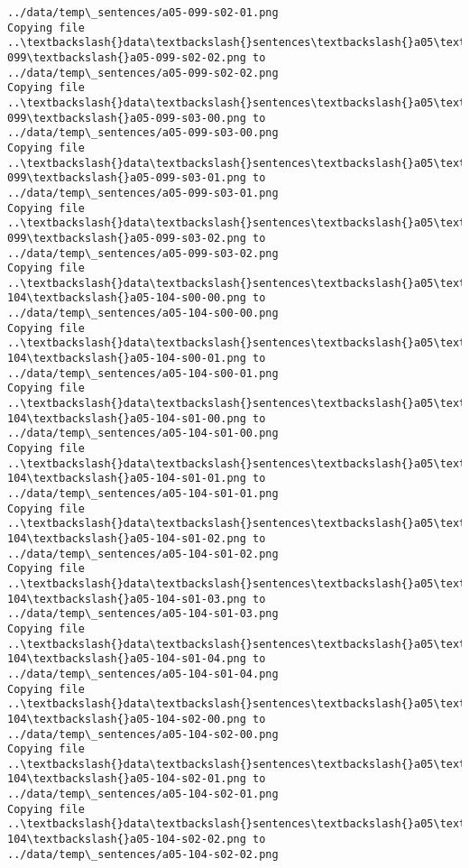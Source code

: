 \documentclass[11pt]{article}
\begin{document}
\begin{Verbatim}[commandchars=\\\{\}]
../data/temp\_sentences/a05-099-s02-01.png
Copying file ..\textbackslash{}data\textbackslash{}sentences\textbackslash{}a05\textbackslash{}a05-099\textbackslash{}a05-099-s02-02.png to
../data/temp\_sentences/a05-099-s02-02.png
Copying file ..\textbackslash{}data\textbackslash{}sentences\textbackslash{}a05\textbackslash{}a05-099\textbackslash{}a05-099-s03-00.png to
../data/temp\_sentences/a05-099-s03-00.png
Copying file ..\textbackslash{}data\textbackslash{}sentences\textbackslash{}a05\textbackslash{}a05-099\textbackslash{}a05-099-s03-01.png to
../data/temp\_sentences/a05-099-s03-01.png
Copying file ..\textbackslash{}data\textbackslash{}sentences\textbackslash{}a05\textbackslash{}a05-099\textbackslash{}a05-099-s03-02.png to
../data/temp\_sentences/a05-099-s03-02.png
Copying file ..\textbackslash{}data\textbackslash{}sentences\textbackslash{}a05\textbackslash{}a05-104\textbackslash{}a05-104-s00-00.png to
../data/temp\_sentences/a05-104-s00-00.png
Copying file ..\textbackslash{}data\textbackslash{}sentences\textbackslash{}a05\textbackslash{}a05-104\textbackslash{}a05-104-s00-01.png to
../data/temp\_sentences/a05-104-s00-01.png
Copying file ..\textbackslash{}data\textbackslash{}sentences\textbackslash{}a05\textbackslash{}a05-104\textbackslash{}a05-104-s01-00.png to
../data/temp\_sentences/a05-104-s01-00.png
Copying file ..\textbackslash{}data\textbackslash{}sentences\textbackslash{}a05\textbackslash{}a05-104\textbackslash{}a05-104-s01-01.png to
../data/temp\_sentences/a05-104-s01-01.png
Copying file ..\textbackslash{}data\textbackslash{}sentences\textbackslash{}a05\textbackslash{}a05-104\textbackslash{}a05-104-s01-02.png to
../data/temp\_sentences/a05-104-s01-02.png
Copying file ..\textbackslash{}data\textbackslash{}sentences\textbackslash{}a05\textbackslash{}a05-104\textbackslash{}a05-104-s01-03.png to
../data/temp\_sentences/a05-104-s01-03.png
Copying file ..\textbackslash{}data\textbackslash{}sentences\textbackslash{}a05\textbackslash{}a05-104\textbackslash{}a05-104-s01-04.png to
../data/temp\_sentences/a05-104-s01-04.png
Copying file ..\textbackslash{}data\textbackslash{}sentences\textbackslash{}a05\textbackslash{}a05-104\textbackslash{}a05-104-s02-00.png to
../data/temp\_sentences/a05-104-s02-00.png
Copying file ..\textbackslash{}data\textbackslash{}sentences\textbackslash{}a05\textbackslash{}a05-104\textbackslash{}a05-104-s02-01.png to
../data/temp\_sentences/a05-104-s02-01.png
Copying file ..\textbackslash{}data\textbackslash{}sentences\textbackslash{}a05\textbackslash{}a05-104\textbackslash{}a05-104-s02-02.png to
../data/temp\_sentences/a05-104-s02-02.png

\end{Verbatim}
\end{document}
